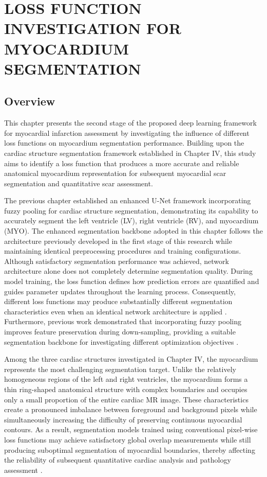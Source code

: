 \chapter{LOSS FUNCTION INVESTIGATION FOR MYOCARDIUM SEGMENTATION} 
 
\section{Overview}
\label{sec:ch5-intro-overview}  


This chapter presents the second stage of the proposed deep learning framework for myocardial infarction assessment by investigating the influence of different loss functions on myocardium segmentation performance. Building upon the cardiac structure segmentation framework established in Chapter IV, this study aims to identify a loss function that produces a more accurate and reliable anatomical myocardium representation for subsequent myocardial scar segmentation and quantitative scar assessment.  

The previous chapter established an enhanced U-Net framework incorporating fuzzy pooling for cardiac structure segmentation, demonstrating its capability to accurately segment the left ventricle (LV), right ventricle (RV), and myocardium (MYO). The enhanced segmentation backbone adopted in this chapter follows the architecture previously developed in the first stage of this research while maintaining identical preprocessing procedures and training configurations. Although satisfactory segmentation performance was achieved, network architecture alone does not completely determine segmentation quality. During model training, the loss function defines how prediction errors are quantified and guides parameter updates throughout the learning process. Consequently, different loss functions may produce substantially different segmentation characteristics even when an identical network architecture is applied \citep{Ronneberger2015,Jadon2020,Ma2021}. Furthermore, previous work demonstrated that incorporating fuzzy pooling improves feature preservation during down-sampling, providing a suitable segmentation backbone for investigating different optimization objectives \citep{Riandini2023MeMeA}. 

Among the three cardiac structures investigated in Chapter IV, the myocardium represents the most challenging segmentation target. Unlike the relatively homogeneous regions of the left and right ventricles, the myocardium forms a thin ring-shaped anatomical structure with complex boundaries and occupies only a small proportion of the entire cardiac MR image. These characteristics create a pronounced imbalance between foreground and background pixels while simultaneously increasing the difficulty of preserving continuous myocardial contours. As a result, segmentation models trained using conventional pixel-wise loss functions may achieve satisfactory global overlap measurements while still producing suboptimal segmentation of myocardial boundaries, thereby affecting the reliability of subsequent quantitative cardiac analysis and pathology assessment \citep{Milletari2016,Lin2017,Berman2018,Karimi2019,Ma2021}.

